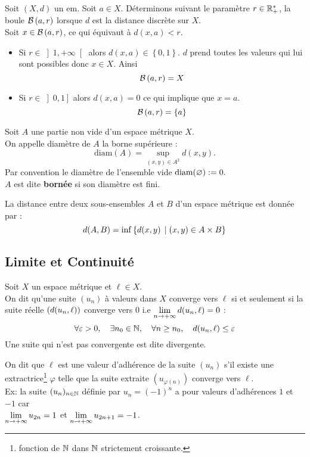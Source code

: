 \documentclass[12pt,a4paper]{article}
\begin{document}
	\begin{exo} Soit $\left(X,d\right) $ un em. Soit $a\in X$. Déterminons suivant le paramètre $r\in \mathbb{R}^*_+$, la boule $\mathcal{B}\left({a},{r}\right)$ lorsque $d$ est la distance discrète sur $X$.\\
	Soit $x\in \mathcal{B}\left({a},{r}\right)$, ce qui équivaut à $d(x,a)< r$.
	\begin{itemize}
		\item Si $ r\in \left] 1,+\infty \right[ $ alors $d(x,a) \in \left\{ 0,1\right\} $. $d$ prend toutes les valeurs qui lui sont possibles donc $x\in X$.
		Ainsi $$ \mathcal{B}\left({a},{r}\right)=X $$
		\item Si $ r\in \left] 0, 1  \right] $ alors $d(x,a)=0$ ce qui implique que $x=a$. $$\mathcal{B}\left({a},{r}\right)=\left\{a\right\} $$ 
	\end{itemize}
\end{exo}

\begin{defini}
Soit $A$ une partie non vide d'un espace métrique $X$.\\
	On appelle diamètre de $A$ la borne supérieure :\[\text{diam}(A)=\sup\limits_{(x,y)\in A^2} d(x,y)  .\]
	Par convention le diamètre de l'ensemble vide $\text{diam}(\varnothing):=0. $\\
	$A$ est dite \textbf{bornée} si son diamètre est fini.
\end{defini}

	\begin{defini}
	La distance entre deux sous-ensembles $A$ et $B$ d'un espace métrique est donnée par :
	\[d(A,B)=\inf\left\lbrace d(x,y)\; \left|\; \left(x,y\right)\in A\times B \right\rbrace \right. \]
		\end{defini} 
	\subsection{Limite et Continuité}
	\begin{defini}
	 Soit $X$ un espace métrique et $\ell \in X$.\\
	On dit qu'une suite $(u_n)$ à valeurs dans $X$ converge vers $\ell$  si et seulement si la suite réelle $\left(\displaystyle d(u_n,\ell )\right)$ converge vers $0$ i.e $\lim\limits_{n\to +\infty} d(u_n,\ell)=0$ :
	\[\forall \varepsilon >0, \quad \exists n_0 \in \mathbb{N}, \quad \forall n \geq n_0 , \quad d(u_n,\ell)\leq \varepsilon  \]
	Une suite qui n'est pas convergente est dite divergente. 
\end{defini}

\begin{defini}
 On dit que $\ell$ est une valeur d'adhérence de la suite $(u_n)$ s'il existe une extractrice\footnote{fonction de $\mathbb{N}$ dans $\mathbb{N}$ strictement croissante.} $\varphi$ telle que la suite extraite $(u_{\varphi(n)})$ converge vers $\ell$.\\
	Ex: la suite $(u_n)_{n\in \mathbb{N}}$ définie par $u_n=(-1)^n$ a pour valeurs d'adhérences $1$ et $-1$ car \\$\lim\limits_{n\to +\infty} u_{2n}=1$ et $\lim\limits_{n\to +\infty} u_{2n+1}=-1$.
\end{defini}
\end{document}
